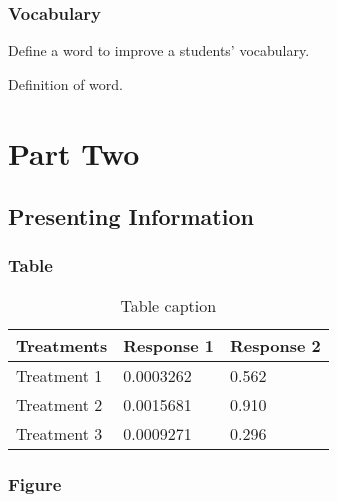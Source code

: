 \documentclass[11pt,fleqn]{book} %
\begin{document}

\section{Vocabulary}

Define a word to improve a students' vocabulary.

\begin{vocabulary}[Word]
Definition of word.
\end{vocabulary}


\part{Part Two}



\chapter{Presenting Information}

\section{Table}

\begin{table}[h]
\centering
\begin{tabular}{l l l}
\toprule
\textbf{Treatments} & \textbf{Response 1} & \textbf{Response 2}\\
\midrule
Treatment 1 & 0.0003262 & 0.562 \\
Treatment 2 & 0.0015681 & 0.910 \\
Treatment 3 & 0.0009271 & 0.296 \\
\bottomrule
\end{tabular}
\caption{Table caption}
\end{table}


\section{Figure}
\end{document}
